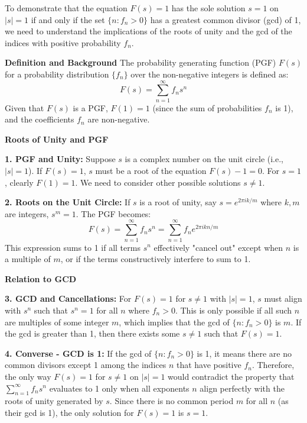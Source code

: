 \documentclass[8pt]{article}
\begin{document}
To demonstrate that the equation \( F(s) = 1 \) has the sole solution \( s = 1 \) on \( |s| = 1 \) if and only if the set \( \{ n : f_n > 0 \} \) has a greatest common divisor (gcd) of 1, we need to understand the implications of the roots of unity and the gcd of the indices with positive probability \( f_n \).

\textbf{Definition and Background}
The probability generating function (PGF) \( F(s) \) for a probability distribution \( \{f_n\} \) over the non-negative integers is defined as:
\[
F(s) = \sum_{n=1}^{\infty} f_n s^n
\]
Given that \( F(s) \) is a PGF, \( F(1) = 1 \) (since the sum of probabilities \( f_n \) is 1), and the coefficients \( f_n \) are non-negative.

\textbf{Roots of Unity and PGF}

\textbf{1. PGF and Unity:} Suppose \( s \) is a complex number on the unit circle (i.e., \( |s| = 1 \)). If \( F(s) = 1 \), \( s \) must be a root of the equation \( F(s) - 1 = 0 \). For \( s = 1 \), clearly \( F(1) = 1 \). We need to consider other possible solutions \( s \neq 1 \).

\textbf{2. Roots on the Unit Circle:} If \( s \) is a root of unity, say \( s = e^{2\pi i k/m} \) where \( k, m \) are integers, \( s^m = 1 \). The PGF becomes:
   \[
   F(s) = \sum_{n=1}^\infty f_n s^n = \sum_{n=1}^\infty f_n e^{2\pi i kn/m}
   \]
   This expression sums to 1 if all terms \( s^n \) effectively "cancel out" except when \( n \) is a multiple of \( m \), or if the terms constructively interfere to sum to 1.

\textbf{Relation to GCD}

\textbf{3. GCD and Cancellations:} For \( F(s) = 1 \) for \( s \neq 1 \) with \( |s| = 1 \), \( s \) must align with \( s^n \) such that \( s^n = 1 \) for all \( n \) where \( f_n > 0 \). This is only possible if all such \( n \) are multiples of some integer \( m \), which implies that the gcd of \( \{ n : f_n > 0 \} \) is \( m \). If the gcd is greater than 1, then there exists some \( s \neq 1 \) such that \( F(s) = 1 \).

\textbf{4. Converse - GCD is 1:} If the gcd of \( \{ n : f_n > 0 \} \) is 1, it means there are no common divisors except 1 among the indices \( n \) that have positive \( f_n \). Therefore, the only way \( F(s) = 1 \) for \( s \neq 1 \) on \( |s| = 1 \) would contradict the property that \( \sum_{n=1}^\infty f_n s^n \) evaluates to 1 only when all exponents \( n \) align perfectly with the roots of unity generated by \( s \). Since there is no common period \( m \) for all \( n \) (as their gcd is 1), the only solution for \( F(s) = 1 \) is \( s = 1 \).
\end{document}
